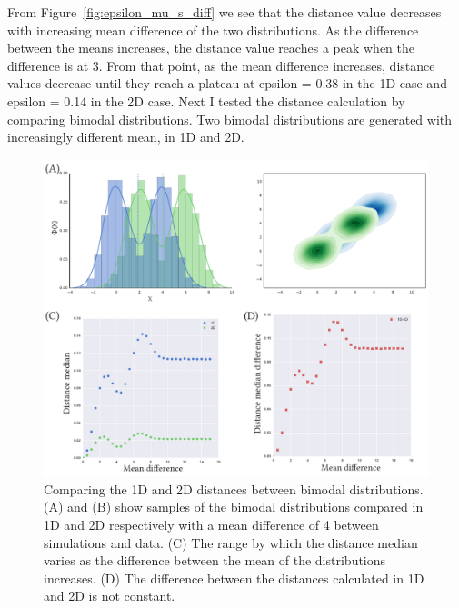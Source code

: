 From Figure~\ref{fig:epsilon_mu_s_diff} we see that the distance value decreases with increasing mean difference of the two distributions. As the difference between the means increases, the distance value reaches a peak when the difference is at 3. From that point, as the mean difference increases, distance values decrease until they reach a plateau at epsilon = 0.38 in the 1D case and epsilon = 0.14 in the 2D case. Next I tested the distance calculation by comparing bimodal distributions. Two bimodal distributions are generated with increasingly different mean, in 1D and 2D. 


\begin{figure}[tb]
\centering
\includegraphics[scale=0.7]{../../chapters/chapterABCFlow/images/multimodal_musd.pdf}
\caption[Distance value ranges of bimodal distributions using the kernel distance]{\label{fig:multimodal_musd}Comparing the 1D and 2D distances between bimodal distributions. (A) and (B) show samples of the bimodal distributions compared in 1D and 2D respectively with a mean difference of 4 between simulations and data. (C) The range by which the distance median varies as the difference between the mean of the distributions increases. (D) The difference between the distances calculated in 1D and 2D is not constant.}

\end{figure}


